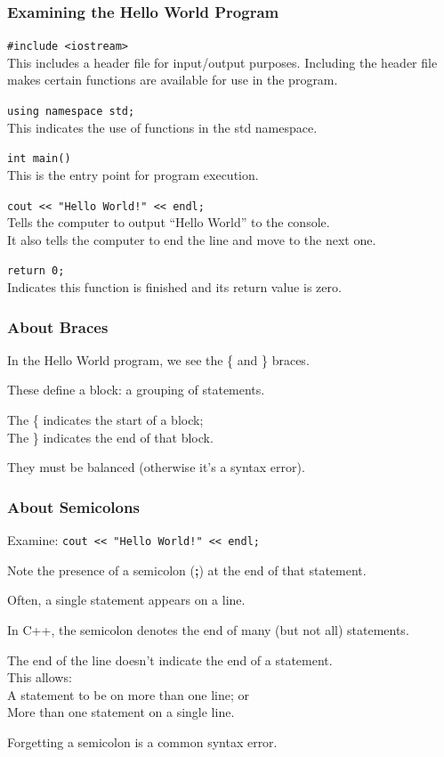 \begin{frame}
\frametitle{Examining the Hello World Program}

\texttt{\#include <iostream>}\\
\quad This includes a header file for input/output purposes. Including the header file makes certain functions are available for use in the program.

\texttt{using namespace std;}\\
\quad This indicates the use of functions in the std namespace.

\texttt{int main()}\\
\quad This is the entry point for program execution.

\texttt{cout << "Hello World!" << endl;}\\
\quad Tells the computer to output ``Hello World'' to the console.\\
\quad It also tells the computer to end the line and move to the next one.

\texttt{return 0;}\\
\quad Indicates this function is finished and its return value is zero.

\end{frame}

\begin{frame}
\frametitle{About Braces}

In the Hello World program, we see the \{ and \} braces.

These define a \alert{block}: a grouping of statements.

The \{ indicates the start of a block; \\
The \} indicates the end of that block.

They must be balanced (otherwise it's a syntax error).

\end{frame}

\begin{frame}
\frametitle{About Semicolons}

Examine: \texttt{cout << "Hello World!" << endl;}

Note the presence of a semicolon (\textbf{;}) at the end of that statement.

Often, a single statement appears on a line.

In C++, the semicolon denotes the end of many (but not all) statements.

The end of the line doesn't indicate the end of a statement.\\
This allows:\\
\quad\quad A statement to be on more than one line; or\\
\quad\quad More than one statement on a single line.

Forgetting a semicolon is a common syntax error.

\end{frame}


